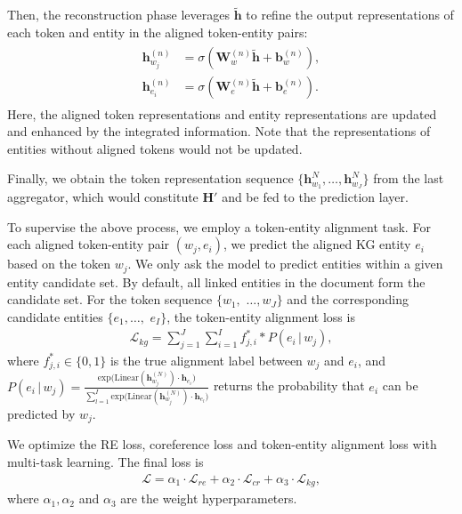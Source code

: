 \documentclass[runningheads]{llncs}
\begin{document}
Then, the reconstruction phase leverages $\tilde{\mathbf{h}}$ to refine the output representations of each token and entity in the aligned token-entity pairs:
\begin{align}
\begin{aligned}
	\mathbf{h}_{w_j}^{(n)} &= \sigma (\mathbf{W}_w^{(n)} \tilde{\mathbf{h}} + \mathbf{b}_w^{(n)}), \\
	\mathbf{h}_{e_i}^{(n)} &= \sigma (\mathbf{W}_{e}^{(n)} \tilde{\mathbf{h}} + \mathbf{b}_e^{(n)}).
\end{aligned}
\end{align}
Here, the aligned token representations and entity representations are updated and enhanced by the integrated information.
Note that the representations of entities without aligned tokens would not be updated.

Finally, we obtain the token representation sequence $\{\mathbf{h}_{w_1}^{N}, \dots, \mathbf{h}_{w_J}^{N}\}$ from the last aggregator, which would constitute $\mathbf{H}'$ and be fed to the prediction layer. 

To supervise the above process, we employ a token-entity alignment task. 
For each aligned token-entity pair $(w_j, e_i)$, we predict the aligned KG entity $e_i$ based on the token $w_j$. 
We only ask the model to predict entities within a given entity candidate set. 
By default, all linked entities in the document form the candidate set. 
For the token sequence $\{ w_1,$ $\dots, w_J\}$ and the corresponding candidate entities $\{e_1,\dots,$ $e_I\}$, the token-entity alignment loss is
\begin{align}
    \mathcal{L}_{kg} = \sum_{j=1}^{J} \sum_{i=1}^{I} f_{j,i}^* * P(e_i\,|\,w_j),
\end{align}
where $f_{j,i}^*\in\{0,1\}$ is the true alignment label between $w_j$ and $e_i$, and $P (e_i\,|\,w_j) = \frac{\mathrm{exp} \big(\textrm{Linear} (\mathbf{h}_{w_j}^{(N)}) \cdot \mathbf{h}_{e_i}\big)} {\sum_{l=1}^{I} \mathrm{exp} \big(\mathrm{Linear} (\mathbf{h}_{w_j}^{(N)}) \cdot \mathbf{h}_{e_l}\big)}$ returns the probability that $e_i$ can be predicted by $w_j$.

We optimize the RE loss, coreference loss and token-entity alignment loss with multi-task learning. 
The final loss is
\begin{align}
    \mathcal{L} = \alpha_1\cdot \mathcal{L}_{re} + \alpha_2\cdot \mathcal{L}_{cr} + \alpha_3\cdot \mathcal{L}_{kg},
\end{align}
where $\alpha_1, \alpha_2$ and $\alpha_3$ are the weight hyperparameters.
\end{document}
